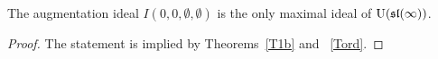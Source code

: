 \documentclass[10pt]{amsart}\oddsidemargin -1mm \evensidemargin -1mm \topmargin -15mm\headheight5mm \headsep 3.5mm \textheight 245mm\textwidth 170mm %
\begin{document}
\begin{corollary}The augmentation ideal $I(0, 0, \emptyset, \emptyset)$ is the only maximal ideal of $\operatorname{\mathrm{U}}(\frak{sl}(\infty))$.\end{corollary}
\begin{proof} The statement  is implied by Theorems~\ref{T1b} and ~\ref{Tord}.\end{proof}
\end{document}
